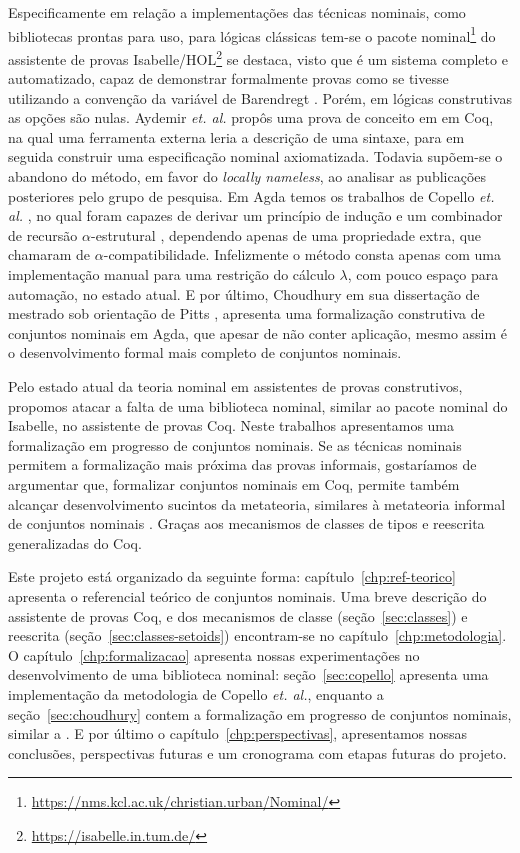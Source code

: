 Especificamente em relação a implementações das técnicas nominais, como bibliotecas prontas para uso, para lógicas clássicas tem-se o pacote nominal\footnote{\url{https://nms.kcl.ac.uk/christian.urban/Nominal/}} \cite{Urban2008} do assistente de provas Isabelle/HOL\footnote{\url{https://isabelle.in.tum.de/}} \cite{Nipkow2002} se destaca, visto que é um sistema completo e automatizado, capaz de demonstrar formalmente provas como se tivesse utilizando a convenção da variável de Barendregt \cite[BVC]{Barendregt2012}. Porém, em lógicas construtivas as opções são nulas. Aydemir \textit{et. al.} propôs uma prova de conceito em \cite{Aydemir2007} em Coq, na qual uma ferramenta externa leria a descrição de uma sintaxe, para em seguida construir uma especificação nominal axiomatizada. Todavia supõem-se o abandono do método, em favor do \textit{locally nameless}, ao analisar as publicações posteriores pelo grupo de pesquisa. Em Agda temos os trabalhos de Copello \textit{et. al.} \cite{Copello2016,Copello2018} , no qual foram capazes de derivar um princípio de indução e um combinador de recursão $\alpha$-estrutural \cite{Pitts2006}, dependendo apenas de uma propriedade extra, que chamaram de $\alpha$-compatibilidade. Infelizmente o método consta apenas com uma implementação manual para uma restrição do cálculo $\lambda$, com pouco espaço para automação, no estado atual. E por último, Choudhury em sua dissertação de mestrado sob orientação de Pitts \cite{Choudhury2015}, apresenta uma formalização construtiva de conjuntos nominais em Agda, que apesar de não conter aplicação, mesmo assim é o desenvolvimento formal mais completo de conjuntos nominais.

Pelo estado atual da teoria nominal em assistentes de provas construtivos, propomos atacar a falta de uma biblioteca nominal, similar ao pacote nominal do Isabelle, no assistente de provas Coq. Neste trabalhos apresentamos uma formalização em progresso de conjuntos nominais. Se as técnicas nominais permitem a formalização mais próxima das provas informais, gostaríamos de argumentar que, formalizar conjuntos nominais em Coq, permite também alcançar desenvolvimento sucintos da metateoria, similares à metateoria informal de conjuntos nominais \cite{Pitts2013}. Graças aos mecanismos de classes de tipos e reescrita generalizadas do Coq.

Este projeto está organizado da seguinte forma: capítulo~\ref{chp:ref-teorico} apresenta o referencial teórico de conjuntos nominais. Uma breve descrição do assistente de provas Coq, e dos mecanismos de classe (seção~\ref{sec:classes}) e reescrita (seção~\ref{sec:classes-setoids}) encontram-se no capítulo~\ref{chp:metodologia}. O capítulo~\ref{chp:formalizacao} apresenta nossas experimentações no desenvolvimento de uma biblioteca nominal: seção~\ref{sec:copello}
apresenta uma implementação da metodologia de Copello \textit{et. al.}, enquanto a seção~\ref{sec:choudhury} contem a formalização em progresso de conjuntos nominais, similar a \cite{Choudhury2015}. E por último o capítulo~\ref{chp:perspectivas}, apresentamos nossas conclusões, perspectivas futuras e um cronograma com etapas futuras do projeto.